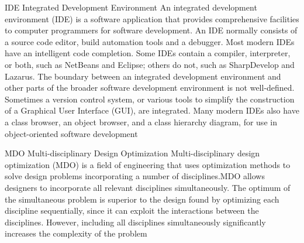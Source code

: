   {IDE}            %
  {Integrated Development Environment}  %
  {An integrated development environment (IDE) is a software application that provides comprehensive facilities to computer programmers for software development. An IDE normally consists of a source code editor, build automation tools and a debugger. Most modern IDEs have an intelligent code completion. Some IDEs contain a compiler, interpreter, or both, such as NetBeans and Eclipse; others do not, such as SharpDevelop and Lazarus. The boundary between an integrated development environment and other parts of the broader software development environment is not well-defined. Sometimes a version control system, or various tools to simplify the construction of a Graphical User Interface (GUI), are integrated. Many modern IDEs also have a class browser, an object browser, and a class hierarchy diagram, for use in object-oriented software development} %

  {MDO}            %
  {Multi-disciplinary Design Optimization}  %
  {Multi-disciplinary design optimization (MDO) is a field of engineering that uses optimization methods to solve design problems incorporating a number of disciplines.MDO allows designers to incorporate all relevant disciplines simultaneously. The optimum of the simultaneous problem is superior to the design found by optimizing each discipline sequentially, since it can exploit the interactions between the disciplines. However, including all disciplines simultaneously significantly increases the complexity of the problem} %





